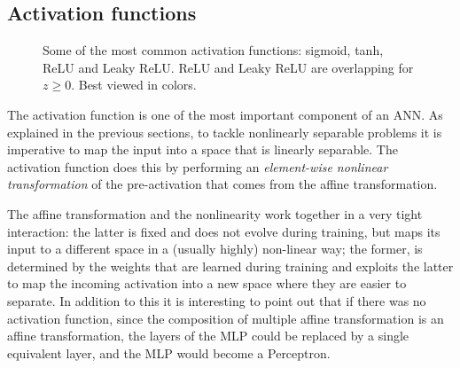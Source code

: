 \subsection{Activation functions}\label{sec:activations}
\begin{figure}[t]
    \centering
    \caption{Some of the most common activation functions: sigmoid, tanh, ReLU
        and Leaky ReLU. ReLU and Leaky ReLU are overlapping for $z \geq 0$.
        Best viewed in colors.\label{fig:activations}}
\end{figure}

The activation function is one of the most important component of an ANN. As
explained in the previous sections, to tackle nonlinearly separable problems it
is imperative to map the input into a space that is linearly separable. The
activation function does this by performing an \emph{element-wise nonlinear
transformation} of the pre-activation that comes from the affine
transformation.

The affine transformation and the nonlinearity work together in a very tight
interaction: the latter is fixed and does not evolve during training, but
maps its input to a different space in a (usually highly) non-linear way; the
former, is determined by the weights that are learned during training and
exploits the latter to map the incoming activation into a new space where they
are easier to separate. In addition to this it is interesting to point out that
if there was no activation function, since the composition of multiple affine
transformation is an affine transformation, the layers of the MLP could be
replaced by a single equivalent layer, and the MLP would become a Perceptron.

